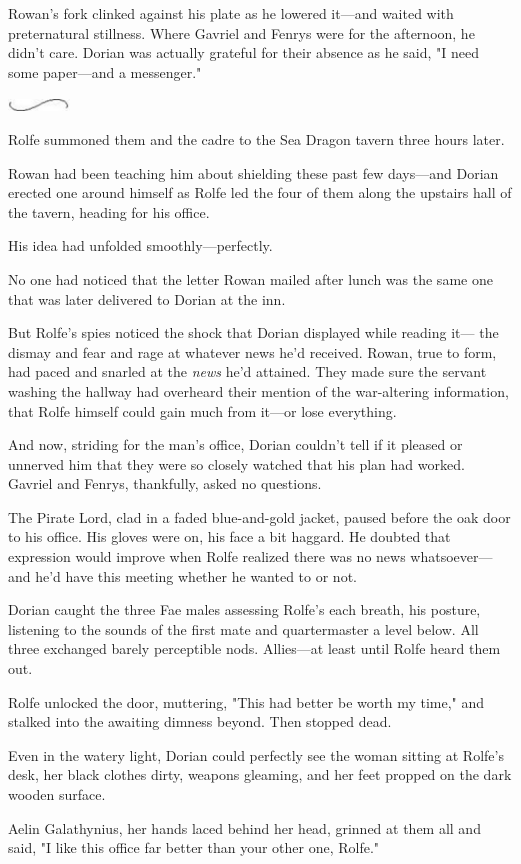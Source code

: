 Rowan's fork clinked against his plate as he lowered it---and waited with preternatural stillness. Where Gavriel and Fenrys were for the afternoon, he didn't care. Dorian was actually grateful for their absence as he said, "I need some paper---and a messenger."

\includegraphics[width=0.65in,height=0.13in]{images/seperator}

Rolfe summoned them and the cadre to the Sea Dragon tavern three hours later.

Rowan had been teaching him about shielding these past few days---and Dorian erected one around himself as Rolfe led the four of them along the upstairs hall of the tavern, heading for his office.

His idea had unfolded smoothly---perfectly.

No one had noticed that the letter Rowan mailed after lunch was the same one that was later delivered to Dorian at the inn.

But Rolfe's spies noticed the shock that Dorian displayed while reading it--- the dismay and fear and rage at whatever news he'd received. Rowan, true to form, had paced and snarled at the \emph{news} he'd attained. They made sure the servant washing the hallway had overheard their mention of the war-altering information, that Rolfe himself could gain much from it---or lose everything.

And now, striding for the man's office, Dorian couldn't tell if it pleased or unnerved him that they were so closely watched that his plan had worked. Gavriel and Fenrys, thankfully, asked no questions.

The Pirate Lord, clad in a faded blue-and-gold jacket, paused before the oak door to his office. His gloves were on, his face a bit haggard. He doubted that expression would improve when Rolfe realized there was no news whatsoever--- and he'd have this meeting whether he wanted to or not.

Dorian caught the three Fae males assessing Rolfe's each breath, his posture, listening to the sounds of the first mate and quartermaster a level below. All three exchanged barely perceptible nods. Allies---at least until Rolfe heard them out.

Rolfe unlocked the door, muttering, "This had better be worth my time," and stalked into the awaiting dimness beyond. Then stopped dead.

Even in the watery light, Dorian could perfectly see the woman sitting at Rolfe's desk, her black clothes dirty, weapons gleaming, and her feet propped on the dark wooden surface.

Aelin Galathynius, her hands laced behind her head, grinned at them all and said, "I like this office far better than your other one, Rolfe."
